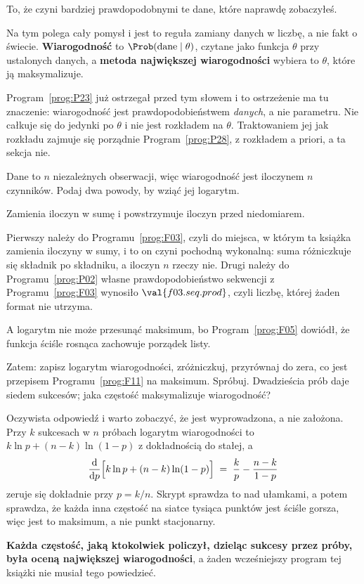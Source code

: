 \begin{fr}
\begin{ansblock}
To, że czyni bardziej prawdopodobnymi te dane, które naprawdę zobaczyłeś.
\end{ansblock}

Na tym polega cały pomysł i jest to reguła zamiany danych w liczbę, a nie
fakt o świecie. \textbf{Wiarogodność} to
$\Prob(\text{dane} \mid \theta)$, czytane jako funkcja $\theta$ przy
ustalonych danych, a \textbf{metoda największej wiarogodności} wybiera to
$\theta$, które ją maksymalizuje.

Program~\ref{prog:P23} już ostrzegał przed tym słowem i to ostrzeżenie ma tu
znaczenie: wiarogodność jest prawdopodobieństwem \emph{danych}, a nie
parametru. Nie całkuje się do jedynki po $\theta$ i nie jest rozkładem na
$\theta$. Traktowaniem jej jak rozkładu zajmuje się porządnie
Program~\ref{prog:P28}, z rozkładem a priori, a ta sekcja nie.

Dane to $n$ niezależnych obserwacji, więc wiarogodność jest iloczynem $n$
czynników. Podaj dwa powody, by wziąć jej logarytm.
\dotline
\nextframe
\end{fr}

\begin{fr}
\begin{ansblock}
Zamienia iloczyn w sumę i powstrzymuje iloczyn przed niedomiarem.
\end{ansblock}

Pierwszy należy do Programu~\ref{prog:F03}, czyli do miejsca, w którym ta
książka zamienia iloczyny w sumy, i to on czyni pochodną wykonalną: suma
różniczkuje się składnik po składniku, a iloczyn $n$ rzeczy nie. Drugi należy
do Programu~\ref{prog:P02} \dash{} własne prawdopodobieństwo sekwencji z
Programu~\ref{prog:F03} wynosiło $\val{f03.seq.prod}$, czyli liczbę, której
żaden format nie utrzyma.

A logarytm nie może przesunąć maksimum, bo Program~\ref{prog:F05} dowiódł, że
funkcja ściśle rosnąca zachowuje porządek listy.

Zatem: zapisz logarytm wiarogodności, zróżniczkuj, przyrównaj do zera, co
jest przepisem Programu~\ref{prog:F11} na maksimum. Spróbuj. Dwadzieścia prób
daje siedem sukcesów; jaka częstość maksymalizuje wiarogodność?
\dotline
\nextframe
\end{fr}

\begin{fr}

Oczywista odpowiedź i warto zobaczyć, że jest wyprowadzona, a nie założona.
Przy $k$ sukcesach w $n$ próbach logarytm wiarogodności to
$k\ln p + (n-k)\ln(1-p)$ z dokładnością do stałej, a
\[ \frac{\mathrm{d}}{\mathrm{d}p}
   \Bigl[k\ln p + (n-k)\ln(1-p)\Bigr]
   \;=\; \frac{k}{p} - \frac{n-k}{1-p} \]
zeruje się dokładnie przy $p = k/n$. Skrypt sprawdza to nad ułamkami, a potem
sprawdza, że każda inna częstość na siatce tysiąca punktów jest ściśle
gorsza, więc jest to maksimum, a nie punkt stacjonarny.

\textbf{Każda częstość, jaką ktokolwiek policzył, dzieląc sukcesy przez
próby, była oceną największej wiarogodności}, a żaden wcześniejszy program tej
książki nie musiał tego powiedzieć.
\end{fr}

